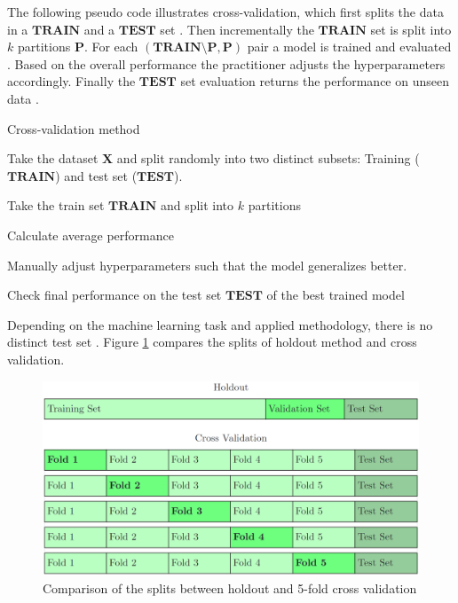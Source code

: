 \documentclass[draft,final,oneside]{vutinfth} %
\begin{document}
The following pseudo code illustrates cross-validation, which first splits the data in a $\boldsymbol{TRAIN}$ and a $\boldsymbol{TEST}$ set \cite{holdoutcrossvalidation}. Then incrementally the $\boldsymbol{TRAIN}$ set is split into $k$ partitions $\boldsymbol{P}$. For each $(\boldsymbol{TRAIN} \setminus \boldsymbol{P}, \boldsymbol{P})$ pair a model is trained and evaluated \cite{bishop}. Based on the overall performance the practitioner adjusts the hyperparameters accordingly. Finally the $\boldsymbol{TEST}$ set evaluation returns the performance on unseen data \cite{holdoutcrossvalidation}.

\begin{algorithm}
\caption{Cross-validation method \cite{holdoutcrossvalidation}}\label{holdoutalgo}
Take the dataset $\boldsymbol{X}$ and split randomly into two distinct subsets: Training ($\boldsymbol{TRAIN}$) and test set ($\boldsymbol{TEST}$).

 {
Take the train set $\boldsymbol{TRAIN}$ and split into $k$ partitions


Calculate average performance

Manually adjust hyperparameters such that the model generalizes better.
}

Check final performance on the test set $\boldsymbol{TEST}$ of the best trained model

\end{algorithm}

Depending on the machine learning task and applied methodology, there is no distinct test set \cite{holdoutcrossvalidation}. Figure \ref{fig:holdoutvscv} compares the splits of holdout method and cross validation.

\begin{figure}[ht]
	\centering
  	\includegraphics[width=1.0\textwidth]{graphics/holdoutvscv.png}
	\caption{Comparison of the splits between holdout and 5-fold cross validation}
	\label{fig:holdoutvscv}
\end{figure}
\end{document}
